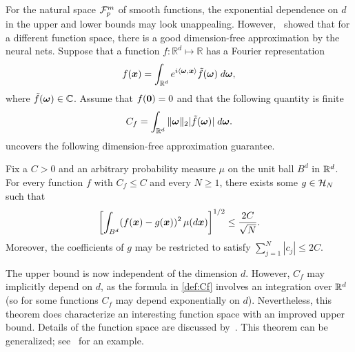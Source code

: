 For the natural space $\mathcal{F}^m_p$ of smooth functions, the exponential dependence on $d$ in the upper and lower bounds may look unappealing. However,~\cite{barron1993universal} showed that for a different function space, there is a good dimension-free approximation by the neural nets. Suppose that a function $f: \mathbb{R}^{d} \mapsto \mathbb{R}$ has a Fourier representation
\begin{equation} \label{eq5.3}
f(\text{\boldmath $x$}) = \int_{\mathbb{R}^{d}} e^{i \langle \text{\boldmath $\omega$}, \text{\boldmath $x$} \rangle} \tilde f (\text{\boldmath $\omega$})\; d\text{\boldmath $\omega$},
\end{equation}
where $\tilde f (\text{\boldmath $\omega$}) \in \mathbb{C}$. Assume that $f(\mathrm{\bf 0}) = 0$ and that the following quantity is finite
\begin{equation}\label{def:Cf}
C_f = \int_{\mathbb{R}^{d}} \| \text{\boldmath $\omega$} \|_2 | \tilde f (\text{\boldmath $\omega$}) | \; d\text{\boldmath $\omega$}.
\end{equation}
\cite{barron1993universal} uncovers the following dimension-free approximation guarantee.
\begin{thm}\label{thm:approx3}
Fix a $C>0$ and an arbitrary probability measure $\mu$ on the unit ball $B^d$ in $\mathbb{R}^d$. For every function $f$ with $C_f \le C$ and every $N \ge 1$, there exists some $g \in \mathcal{H}_N$ such that
\begin{equation*}
\left[ \int_{B^d} ( f(\text{\boldmath $x$}) - g(\text{\boldmath $x$}))^2 \, \mu(d\text{\boldmath $x$}) \right]^{1/2} \le \frac{2C}{\sqrt{N}}.
\end{equation*}
Moreover, the coefficients of $g$ may be restricted to satisfy $\sum_{j=1}^N |c_j| \le 2C$.%
\end{thm}
The upper bound is now independent of the dimension $d$. %
However, $C_f$ may implicitly depend on $d$, as the formula in \eqref{def:Cf} involves an integration over $\mathbb{R}^{d}$ (so for some functions $C_f$ may depend exponentially on $d$). Nevertheless, this theorem does characterize an interesting function space with an improved upper bound. Details of the function space are discussed by~\cite{barron1993universal}. This theorem can be generalized; see~\cite{makovoz1996random} for an example.

